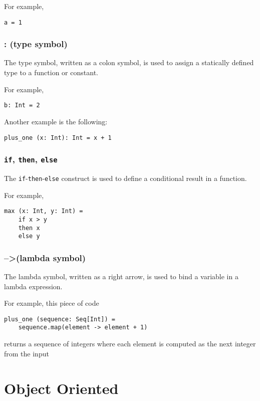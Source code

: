 \documentclass[12pt,a4paper]{book}
\newcommand{\srccode}[1]{\texttt{{#1}}}
\newcommand{\reservedWord}[1]{{\color{blue}\srccode{#1}}\xspace}
\newcommand{\slambda}{{\tiny--\textgreater}\xspace}
\newcommand{\sif}{\reservedWord{if}}
\newcommand{\sthen}{\reservedWord{then}}
\newcommand{\selse}{\reservedWord{else}}
\begin{document}
    For example,
    \begin{lstlisting}[label={lst:exampleDef}]
  a = 1
    \end{lstlisting}

    \subsubsection{: (type symbol)}

    The type symbol, written as a colon symbol, is used to assign a statically defined type to a function or constant.

    For example,
    \begin{lstlisting}[label={lst:exampleType01}]
  b: Int = 2
    \end{lstlisting}

    Another example is the following:
    \begin{lstlisting}[label={lst:exampleType02}]
  plus_one (x: Int): Int = x + 1
    \end{lstlisting}

    \subsubsection{\sif, \sthen, \selse}

    The \sif-\sthen-\selse construct is used to define a conditional result in a function.

    For example,
    \begin{lstlisting}[label={lst:exampleIfThenElse}]
  max (x: Int, y: Int) =
    if x > y
    then x
    else y
    \end{lstlisting}

    \subsubsection{\slambda (lambda symbol)}

    The lambda symbol, written as a right arrow, is used to bind a variable in a lambda expression.

    For example, this piece of code
    \begin{lstlisting}[label={lst:exampleLambda}]
  plus_one (sequence: Seq[Int]) =
    sequence.map(element -> element + 1)
    \end{lstlisting}
    returns a sequence of integers where each element is computed as the next integer from the input


    \section{Object Oriented}
\end{document}
